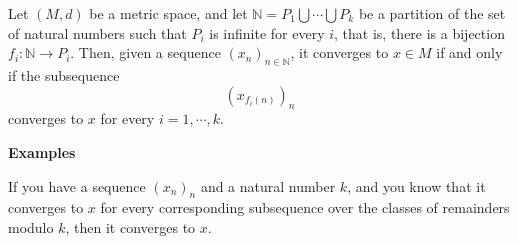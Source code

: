 \documentclass[12pt]{article}
\begin{document}
Let $(M, d)$ be a metric space, and let $ \mathbb{N} = P_{1} \bigcup \cdots \bigcup P_{k}$ be a partition of the set of natural numbers such that $P_{i}$ is infinite for every $i$, that is, there is a bijection $f_{i} \colon \mathbb{N} \to P_{i}$. Then, given a sequence $(x_n)_{n \in \mathbb{N}}$, it converges to $x \in M$ if and only if the subsequence $$(x_{f_i(n)})_n$$ converges to $x$ for every $i = 1, \cdots, k$.


\textbf{Examples}

If you have a sequence $(x_n)_n$ and a natural number $k$, and you know that it converges to $x$ for every corresponding subsequence over the classes of remainders modulo $k$, then it converges to $x$.
\end{document}
